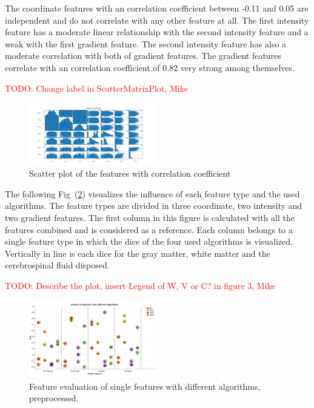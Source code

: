\documentclass[journal]{IEEEtran}
\newcommand\TODO[1]{\textcolor{red}{TODO: #1}}
\begin{document}
The coordinate features with an correlation coefficient between -0.11 and 0.05 are independent and do not correlate with any other feature at all. The first intensity feature has a moderate linear relationship with the second intensity feature and a weak with the first gradient feature. The second intensity feature has also a moderate correlation with both of gradient features. The gradient features correlate with an correlation coefficient of 0.82 very strong among themselves.    

\TODO{Change label in ScatterMatrixPlot, Mike}

\begin{figure}[h]
	\centering
	\includegraphics[width=0.49\textwidth]{images/ScatterPlotMatrix}
	\caption{Scatter plot of the features with correlation coefficient}
	\label{scatterplot}
\end{figure}

The following Fig~(\ref{FeatEval}) visualizes the influence of each feature type and the used algorithms. The feature types are divided in three coordinate, two intensity and two gradient features. The first column in this figure is calculated with all the features combined and is considered as a reference. Each column belongs to a single feature type in which the dice of the four used algorithms is visualized. Vertically in line is each dice for the gray matter, white matter and the cerebrospinal fluid disposed.

\TODO{Describe the plot, insert Legend of W, V or C? in figure 3, Mike}
\begin{figure}[h]
	\centering
	\includegraphics[width=0.49\textwidth]{images/FeatureEvaluation}
	\caption{Feature evaluation of single features with different algorithms, preprocessed.}
	\label{FeatEval}
\end{figure}
\end{document}
